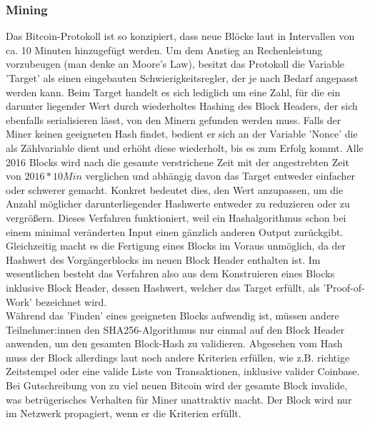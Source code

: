\subsubsection{Mining}
Das Bitcoin-Protokoll ist so konzipiert, dass neue Blöcke laut \cite{goorha_2019} in Intervallen von ca. 10 Minuten hinzugefügt werden. 
Um dem Anstieg an Rechenleistung vorzubeugen (man denke an Moore's Law), besitzt das Protokoll die Variable 'Target' als einen eingebauten Schwierigkeitsregler, der je nach Bedarf angepasst werden kann.
Beim Target handelt es sich lediglich um eine Zahl, für die ein darunter liegender Wert durch wiederholtes Hashing des Block Headers, der sich ebenfalls serialisieren lässt, von den Minern gefunden werden muss. 
Falls der Miner keinen geeigneten Hash findet, bedient er sich an der Variable 'Nonce' die als Zählvariable dient und erhöht diese wiederholt, bis es zum Erfolg kommt.
Alle 2016 Blocks wird nach \cite{goorha_2019} die gesamte verstrichene Zeit mit der angestrebten Zeit von $2016 * 10 Min$ verglichen und abhängig davon das Target entweder einfacher oder schwerer gemacht. 
Konkret bedeutet dies, den Wert anzupassen, um die Anzahl möglicher darunterliegender Hashwerte entweder zu reduzieren oder zu vergrößern.
Dieses Verfahren funktioniert, weil ein Hashalgorithmus schon bei einem minimal veränderten Input einen gänzlich anderen Output zurückgibt. 
Gleichzeitig macht es die Fertigung eines Blocks im Voraus unmöglich, da der Hashwert des Vorgängerblocks im neuen Block Header enthalten ist. 
Im wesentlichen besteht das Verfahren also aus dem Konstruieren eines Blocks inklusive Block Header, dessen Hashwert, welcher das Target erfüllt, als 'Proof-of-Work' bezeichnet wird.\\

Während das 'Finden' eines geeigneten Blocks aufwendig ist, müssen andere Teilnehmer:innen den SHA256-Algorithmus nur einmal auf den Block Header anwenden, um den gesamten Block-Hash zu validieren. 
Abgesehen vom Hash muss der Block allerdings laut \cite{antanopoulos_2014} noch andere Kriterien erfüllen, wie z.B. richtige Zeitstempel oder eine valide Liste von Transaktionen, inklusive valider Coinbase. 
Bei Gutschreibung von zu viel neuen Bitcoin wird der gesamte Block invalide, was betrügerisches Verhalten für Miner unattraktiv macht. Der Block wird nur im Netzwerk propagiert, wenn er die Kriterien erfüllt.\\

